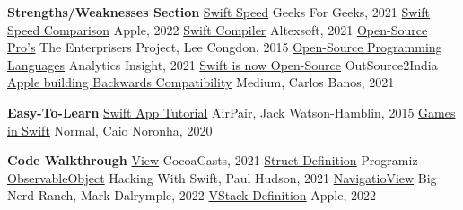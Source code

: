 \documentclass{article}
\theoremstyle{theorem}
\theoremstyle{definition}
\theoremstyle{remark}
\begin{document}
\begin{thebibliography}{99}
\textbf{Strengths/Weaknesses Section}\newline
\href{https://www.geeksforgeeks.org/difference-between-python-and-swift/}{Swift Speed} Geeks For Geeks, 2021 \newline
\href{https://www.apple.com/swift/}{Swift Speed Comparison} Apple, 2022\newline
\href{https://www.altexsoft.com/blog/engineering/the-good-and-the-bad-of-swift-programming-language/}{Swift Compiler} Altexsoft, 2021\newline
\href{https://enterprisersproject.com/article/2015/1/top-advantages-open-source-offers-over-proprietary-solutions}{Open-Source Pro's} The Enterprisers Project, Lee Congdon, 2015 \newline
\href{https://www.analyticsinsight.net/top-10-programming-languages-for-open-source-projects-in-2021/}{Open-Source Programming Languages} Analytics Insight, 2021 \newline
\href{https://www.outsource2india.com/software/mobile-applications/articles/apple-swift-now-open-source.asp}{Swift is now Open-Source} OutSource2India \newline
\href{https://medium.com/@carlos.banos85/swift-5-5-concurrency-backward-compatibility-884fd9c284da}{Apple building Backwards Compatibility} Medium, Carlos Banos, 2021 \newline

\textbf{Easy-To-Learn}\newline
\href{https://www.airpair.com/swift/building-swift-app-tutorial}{Swift App Tutorial} AirPair, Jack Watson-Hamblin, 2015 \newline
\href{https://caiocnoronha.medium.com/games-in-swift-88a72e441537}{Games in Swift} Normal, Caio Noronha, 2020\newline

\textbf{Code Walkthrough}\newline
\href{https://cocoacasts.com/swiftui-fundamentals-what-is-a-view}{View} CocoaCasts, 2021 \newline
\href{https://www.programiz.com/swift-programming/structs#:~:text=In%20Swift%2C%20a%20struct%20is,same%20information%20of%20multiple%20people.}{Struct Definition} Programiz \newline
\href{https://www.hackingwithswift.com/quick-start/swiftui/how-to-use-observedobject-to-manage-state-from-external-objects}{ObservableObject} Hacking With Swift, Paul Hudson, 2021\newline
\href{https://bignerdranch.com/blog/the-different-forms-of-navigation-in-swiftui/}{NavigatioView} Big Nerd Ranch, Mark Dalrymple, 2022\newline
\href{https://developer.apple.com/documentation/swiftui/vstack}{VStack Definition} Apple, 2022\newline

\end{thebibliography}
\end{document}
